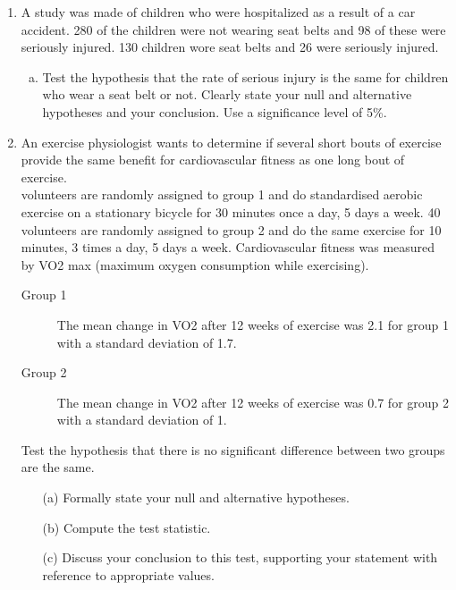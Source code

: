 \documentclass[a4paper,12pt]{article}
\begin{document}
\begin{enumerate}
 \item  A study was made of children who were hospitalized as a result of a car accident. 280 of the children were not wearing seat belts and 98 of these were seriously injured. 130 children wore seat belts and 26 were seriously injured. 
\begin{enumerate}[(a)]
\item Test the hypothesis that the rate of serious injury is the same for children who wear a seat belt or not. Clearly state your null and alternative hypotheses and your conclusion. Use a significance level of 5\%.
\end{enumerate}
\item
An exercise physiologist wants to determine if several short bouts of exercise provide the same benefit for cardiovascular fitness as one long bout of exercise. \\ 


 volunteers are randomly assigned to group 1 and do standardised aerobic exercise on a stationary bicycle for 30 minutes once a day, 5 days a week. 40 volunteers are randomly assigned to group 2 and do the same exercise for 10 minutes, 3 times a day, 5 days a week. Cardiovascular fitness was measured by VO2 max (maximum oxygen consumption while exercising). 
\begin{framed}
\begin{description}
	\item[Group 1] The mean change in VO2 after 12 weeks of exercise was 2.1 for group 1 with a standard deviation of 1.7.
	\item[Group 2] The mean change in VO2 after 12 weeks of exercise was 0.7 for group 2 with a standard deviation of 1. 
\end{description}
\end{framed}

\noindent Test the hypothesis that there is no significant difference between two groups are the same.

\begin{itemize}
	\item[(a)] Formally state your null and alternative hypotheses.
	\item[(b)] Compute the test statistic.
	\item[(c)] Discuss your conclusion to this test, supporting your statement with reference to appropriate values.
\end{itemize}



\end{enumerate}
\end{document}
